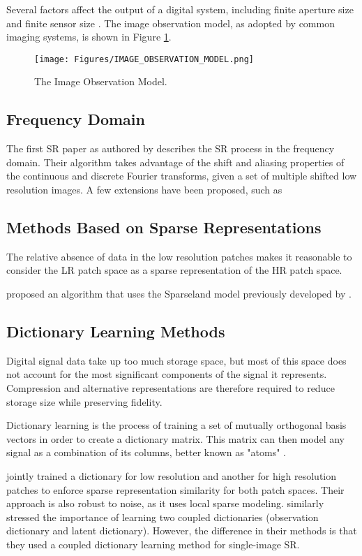 Several factors affect the output of a digital system, including finite aperture size and finite sensor size \citep{Yang2010a}. 
The image observation model, as adopted by common imaging systems, is shown in Figure \ref{fig:IOM}.

\begin{figure}[ht]
	\centering
	\texttt{[image: Figures/IMAGE\_OBSERVATION\_MODEL.png]}
	\caption[]{The Image Observation Model.}
	\label{fig:IOM}
\end{figure}

\subsection{Frequency Domain}
The first SR paper as authored by \cite{tsai1984multiframe} describes the SR process in the frequency domain. 
Their algorithm takes advantage of the shift and aliasing properties of the continuous and discrete Fourier transforms, given a set of multiple shifted low resolution images. 
A few extensions have been proposed, such as 
\citep{Yang2010a}

\subsection{Methods Based on Sparse Representations}
The relative absence of data in the low resolution patches makes it reasonable to consider the LR patch space as a sparse representation of the HR patch space.

\cite{Zeyde2012} proposed an algorithm that uses the Sparseland model previously developed by \cite{Elad2006}.

\subsection{Dictionary Learning Methods}
Digital signal data take up too much storage space, but most of this space does not account for the most significant components of the signal it represents.
Compression and alternative representations are therefore required to reduce storage size while preserving fidelity.

Dictionary learning is the process of training a set of mutually orthogonal basis vectors in order to create a dictionary matrix. 
This matrix can then model any signal as a combination of its columns, better known as "atoms" \citep{Kreutz-Delgado2003}.

\cite{Wright2010} jointly trained a dictionary for low resolution and another for high resolution patches to enforce sparse representation similarity for both patch spaces. Their approach is also robust to noise, as it uses local sparse modeling.
\cite{Yang2012} similarly stressed the importance of learning two coupled dictionaries (observation dictionary and latent dictionary). However, the difference in their methods is that they used a coupled dictionary learning method for single-image SR. 	


